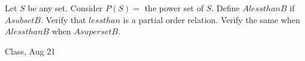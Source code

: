 \begin{samepage}
\begin{ex}
Let $S$ be any set. Consider $P(S) = $ the power set of $S$. Define $A less than B$ if $A subset B$. Verify that $less than$ is a partial order relation.
Verify the same when $A less than B$ when $A superset B$.
\end{ex}
\begin{source}
Class, Aug 21
\end{source}
\end{samepage}
